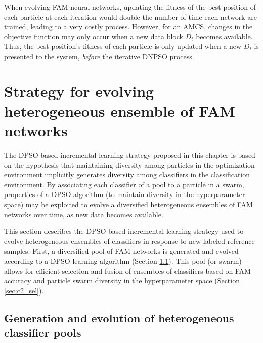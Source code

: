 When evolving FAM neural networks, updating the fitness of the best position of each particle at each iteration would double the number of time each network are trained, leading to a very costly process.
However, for an AMCS, changes in the objective function may only occur when a new data block $D_t$ becomes available.
Thus, the best position's fitness of each particle is only updated when a new $D_t$ is presented to the system, \emph{before} the iterative DNPSO process.

\section{Strategy for evolving heterogeneous ensemble of FAM networks}
\label{sec:c2_algo}

The DPSO-based incremental learning strategy proposed in this chapter is based on the hypothesis that maintaining diversity among particles in the optimization environment implicitly generates diversity among classifiers in the classification environment.
By associating each classifier of a pool to a particle in a swarm, properties of a DPSO algorithm (to maintain diversity in the hyperparameter space) may be exploited to evolve a diversified heterogeneous ensembles of FAM networks over time, as new data becomes available.

This section describes the DPSO-based incremental learning strategy used to evolve heterogeneous ensembles of classifiers in response to new labeled reference samples.
First, a diversified pool of FAM networks is generated and evolved according to a DPSO learning algorithm (Section \ref{sec:c2_pool}).
This pool (or swarm) allows for efficient selection and fusion of ensembles of classifiers based on FAM accuracy and particle swarm diversity in the hyperparameter space (Section \ref{sec:c2_sel}).


\subsection{Generation and evolution of heterogeneous classifier pools}
\label{sec:c2_pool}

